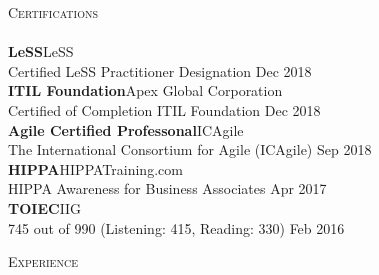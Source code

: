 \documentclass[a4paper]{article}
\newcommand{\lineunder} {
    \vspace*{-8pt} \\
    \hspace*{-18pt} \hrulefill \\
}
\newcommand{\header} [1] {
    {\hspace*{-18pt}\vspace*{6pt} \textsc{#1}}
    \vspace*{-6pt} \lineunder
}
\begin{document}
\header{Certifications}
\textbf{LeSS}\hfill LeSS\\
Certified LeSS Practitioner Designation \hfill Dec 2018\\
\vspace{2mm}
\textbf{ITIL Foundation}\hfill Apex Global Corporation\\
Certified of Completion ITIL Foundation \hfill Dec 2018\\
\vspace{2mm}
\textbf{Agile Certified Professonal}\hfill ICAgile\\
The International Consortium for Agile (ICAgile) \hfill Sep 2018\\
\vspace{2mm}
\textbf{HIPPA}\hfill HIPPATraining.com\\
HIPPA Awareness for Business Associates \hfill Apr 2017\\
\vspace{2mm}
\textbf{TOIEC}\hfill IIG\\
745 out of 990 (Listening: 415, Reading: 330) \hfill Feb 2016\\
\vspace{2mm}

\header{Experience}
\vspace{1mm}
\end{document}
